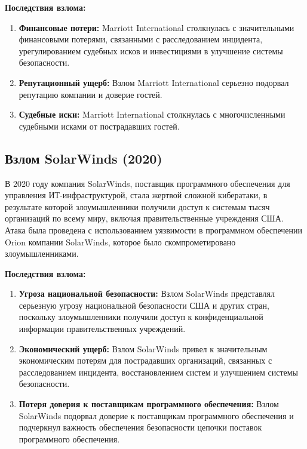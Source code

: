 \documentclass[a4paper,12pt]{diplom}
\begin{document}
	 \textbf{Последствия взлома:}
	 
	 \begin{enumerate}[label=\arabic{enumi})]
	 	\item \textbf{Финансовые потери:}  Marriott International столкнулась с значительными финансовыми потерями, связанными с расследованием инцидента, урегулированием судебных исков и инвестициями в улучшение системы безопасности.
	 	\item \textbf{Репутационный ущерб:}  Взлом Marriott International серьезно подорвал репутацию компании и доверие гостей.
	 	\item \textbf{Судебные иски:}  Marriott International столкнулась с многочисленными судебными исками от пострадавших гостей.
	 \end{enumerate}
	 
	 \subsection{Взлом SolarWinds (2020)}
	 
	 В 2020 году компания SolarWinds, поставщик программного обеспечения для управления ИТ-инфраструктурой, стала жертвой сложной кибератаки, в результате которой злоумышленники получили доступ к системам тысяч организаций по всему миру, включая правительственные учреждения США.  Атака была проведена с использованием уязвимости в программном обеспечении Orion компании SolarWinds, которое было скомпрометировано злоумышленниками.\cite{SolarWinds_attack}
	 
	 \textbf{Последствия взлома:}
	 
	 \begin{enumerate}[label=\arabic{enumi})]
	 	\item \textbf{Угроза национальной безопасности:}  Взлом SolarWinds представлял серьезную угрозу национальной безопасности США и других стран, поскольку злоумышленники получили доступ к конфиденциальной информации правительственных учреждений.
	 	\item \textbf{Экономический ущерб:}  Взлом SolarWinds привел к значительным экономическим потерям для пострадавших организаций, связанных с расследованием инцидента, восстановлением систем и улучшением системы безопасности. 
	 	\item \textbf{Потеря доверия к поставщикам программного обеспечения:}  Взлом SolarWinds подорвал доверие к поставщикам программного обеспечения и подчеркнул важность обеспечения безопасности цепочки поставок программного обеспечения. 
	 \end{enumerate}
	 
\end{document}
